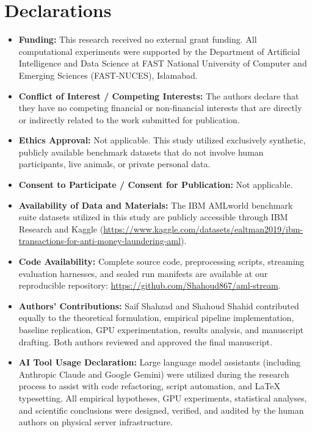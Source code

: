 \documentclass[pdflatex,sn-mathphys,Numbered]{sn-jnl}
\theoremstyle{thmstyleone}
\theoremstyle{thmstyletwo}
\theoremstyle{thmstylethree}
\begin{document}
\section*{Declarations}
\begin{itemize}
    \item \textbf{Funding:} This research received no external grant funding. All computational experiments were supported by the Department of Artificial Intelligence and Data Science at FAST National University of Computer and Emerging Sciences (FAST-NUCES), Islamabad.
    \item \textbf{Conflict of Interest / Competing Interests:} The authors declare that they have no competing financial or non-financial interests that are directly or indirectly related to the work submitted for publication.
    \item \textbf{Ethics Approval:} Not applicable. This study utilized exclusively synthetic, publicly available benchmark datasets that do not involve human participants, live animals, or private personal data.
    \item \textbf{Consent to Participate / Consent for Publication:} Not applicable.
    \item \textbf{Availability of Data and Materials:} The IBM AMLworld benchmark suite datasets utilized in this study are publicly accessible through IBM Research and Kaggle (\url{https://www.kaggle.com/datasets/ealtman2019/ibm-transactions-for-anti-money-laundering-aml}).
    \item \textbf{Code Availability:} Complete source code, preprocessing scripts, streaming evaluation harnesses, and sealed run manifests are available at our reproducible repository: \url{https://github.com/Shahoud867/aml-stream}.
    \item \textbf{Authors' Contributions:} Saif Shahzad and Shahoud Shahid contributed equally to the theoretical formulation, empirical pipeline implementation, baseline replication, GPU experimentation, results analysis, and manuscript drafting. Both authors reviewed and approved the final manuscript.
    \item \textbf{AI Tool Usage Declaration:} Large language model assistants (including Anthropic Claude and Google Gemini) were utilized during the research process to assist with code refactoring, script automation, and LaTeX typesetting. All empirical hypotheses, GPU experiments, statistical analyses, and scientific conclusions were designed, verified, and audited by the human authors on physical server infrastructure.
\end{itemize}
\end{document}
